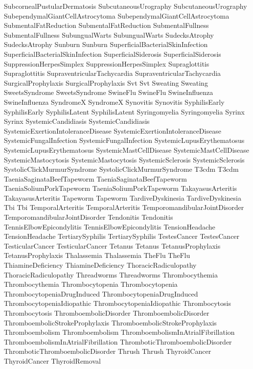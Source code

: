  SubcornealPustularDermatosis
 SubcutaneousUrography
 SubcutaneousUrography
 SubependymalGiantCellAstrocytoma
 SubependymalGiantCellAstrocytoma
 SubmentalFatReduction
 SubmentalFatReduction
 SubmentalFullness
 SubmentalFullness
 SubungualWarts
 SubungualWarts
 SudecksAtrophy
 SudecksAtrophy
 Sunburn
 Sunburn
 SuperficialBacterialSkinInfection
 SuperficialBacterialSkinInfection
 SuperficialSiderosis
 SuperficialSiderosis
 SuppressionHerpesSimplex
 SuppressionHerpesSimplex
 Supraglottitis
 Supraglottitis
 SupraventricularTachycardia
 SupraventricularTachycardia
 SurgicalProphylaxis
 SurgicalProphylaxis
 Svt
 Svt
 Sweating
 Sweating
 SweetsSyndrome
 SweetsSyndrome
 SwineFlu
 SwineFlu
 SwineInfluenza
 SwineInfluenza
 SyndromeX
 SyndromeX
 Synovitis
 Synovitis
 SyphilisEarly
 SyphilisEarly
 SyphilisLatent
 SyphilisLatent
 Syringomyelia
 Syringomyelia
 Syrinx
 Syrinx
 SystemicCandidiasis
 SystemicCandidiasis
 SystemicExertionIntoleranceDisease
 SystemicExertionIntoleranceDisease
 SystemicFungalInfection
 SystemicFungalInfection
 SystemicLupusErythematosus
 SystemicLupusErythematosus
 SystemicMastCellDisease
 SystemicMastCellDisease
 SystemicMastocytosis
 SystemicMastocytosis
 SystemicSclerosis
 SystemicSclerosis
 SystolicClickMurmurSyndrome
 SystolicClickMurmurSyndrome
 T3cdm
 T3cdm
 TaeniaSaginataBeefTapeworm
 TaeniaSaginataBeefTapeworm
 TaeniaSoliumPorkTapeworm
 TaeniaSoliumPorkTapeworm
 TakayasusArteritis
 TakayasusArteritis
 Tapeworm
 Tapeworm
 TardiveDyskinesia
 TardiveDyskinesia
 Tbi
 Tbi
 TemporalArteritis
 TemporalArteritis
 TemporomandibularJointDisorder
 TemporomandibularJointDisorder
 Tendonitis
 Tendonitis
 TennisElbowEpicondylitis
 TennisElbowEpicondylitis
 TensionHeadache
 TensionHeadache
 TertiarySyphilis
 TertiarySyphilis
 TestesCancer
 TestesCancer
 TesticularCancer
 TesticularCancer
 Tetanus
 Tetanus
 TetanusProphylaxis
 TetanusProphylaxis
 Thalassemia
 Thalassemia
 TheFlu
 TheFlu
 ThiamineDeficiency
 ThiamineDeficiency
 ThoracicRadiculopathy
 ThoracicRadiculopathy
 Threadworms
 Threadworms
 Thrombocythemia
 Thrombocythemia
 Thrombocytopenia
 Thrombocytopenia
 ThrombocytopeniaDrugInduced
 ThrombocytopeniaDrugInduced
 ThrombocytopeniaIdiopathic
 ThrombocytopeniaIdiopathic
 Thrombocytosis
 Thrombocytosis
 ThromboembolicDisorder
 ThromboembolicDisorder
 ThromboembolicStrokeProphylaxis
 ThromboembolicStrokeProphylaxis
 Thromboembolism
 Thromboembolism
 ThromboembolismInAtrialFibrillation
 ThromboembolismInAtrialFibrillation
 ThromboticThromboembolicDisorder
 ThromboticThromboembolicDisorder
 Thrush
 Thrush
 ThyroidCancer
 ThyroidCancer
 ThyroidRemoval
